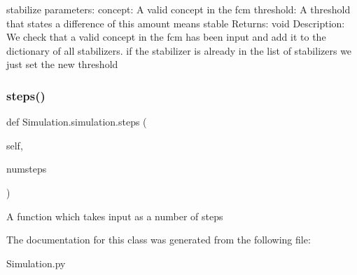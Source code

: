 \begin{DoxyVerb}stabilize
parameters: concept: A valid concept in the fcm
threshold: A threshold that states a difference of this amount means stable
Returns: void
Description: We check that a valid concept in the fcm has been input and add it to the dictionary of all stabilizers.
if the stabilizer is already in the list of stabilizers we just set the new threshold
\end{DoxyVerb}
 \hypertarget{class_simulation_1_1simulation_ae4ffda917687b0cb3cd1582e15e7541d}{}\label{class_simulation_1_1simulation_ae4ffda917687b0cb3cd1582e15e7541d} 
\subsubsection{\texorpdfstring{steps()}{steps()}}
{\footnotesize\ttfamily def Simulation.\+simulation.\+steps (\begin{DoxyParamCaption}\item[{}]{self,  }\item[{}]{numsteps }\end{DoxyParamCaption})}

\begin{DoxyVerb}A function which takes input as a number of steps
\end{DoxyVerb}
 

The documentation for this class was generated from the following file\+:\begin{DoxyCompactItemize}
\item 
Simulation.\+py\end{DoxyCompactItemize}
